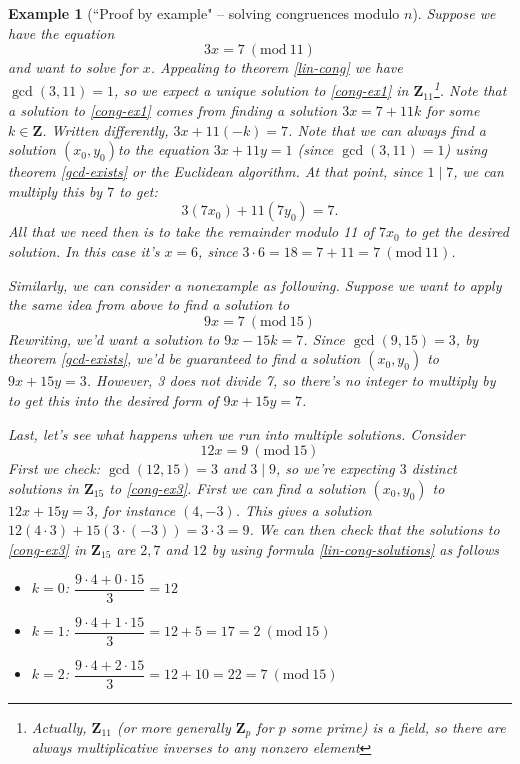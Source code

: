 \documentclass[12pt]{article}
\numberwithin{equation}{subsection}
\theoremstyle{note}
\newtheorem{example}[subsection]{Example}
\newcommand{\Mod}[1]{\ (\mathrm{mod}\ #1)}
\begin{document}
\begin{example}[``Proof by example" -- solving congruences modulo $n$]
Suppose we have the equation \begin{equation} \label{cong-ex1} 3x=7\Mod{11}\end{equation} and want to solve for $x$. Appealing to theorem \ref{lin-cong} we have $\gcd(3,11)=1$, so we expect a unique solution to \eqref{cong-ex1} in $\mathbf{Z}_{11}$\footnote{Actually, $\mathbf{Z}_{11}$ (or more generally $\mathbf{Z}_p$ for $p$ some prime) is a \textit{field}, so there are always multiplicative inverses to any nonzero element}.  Note that a solution to \eqref{cong-ex1} comes from finding a solution $3x=7+11k$ for some $k\in\mathbf{Z}$. Written differently, $3x+11(-k)=7$. Note that we can always find a solution $(x_0,y_0)$to the equation $3x+11y=1$ (since $\gcd(3,11)=1$) using theorem \ref{gcd-exists} or the Euclidean algorithm. At that point, since $1\mid 7$, we can multiply this by $7$ to get: \[ 3(7x_0)+11(7y_0)=7.\] All that we need then is to take the remainder modulo 11 of $7x_0$ to get the desired solution. In this case it's $x=6$, since $3\cdot 6=18=7+11=7\Mod{11}$.

Similarly, we can consider a nonexample as following. Suppose we want to apply the same idea from above to find a solution to \begin{equation} \label{cong-ex2} 9x=7\Mod{15}\end{equation} Rewriting, we'd want a solution to $9x-15k=7$. Since $\gcd(9,15)=3$, by theorem \ref{gcd-exists}, we'd be guaranteed to find a solution $(x_0,y_0)$ to $9x+15y=3$. However, 3 does not divide 7, so there's no integer to multiply by to get this into the desired form of $9x+15y=7$. 

Last, let's see what happens when we run into multiple solutions. Consider \begin{equation} \label{cong-ex3} 12x=9\Mod{15}\end{equation} First we check: $\gcd(12,15)=3$ and $3\mid 9$, so we're expecting $3$ distinct solutions in $\mathbf{Z}_{15}$ to \eqref{cong-ex3}. First we can find a solution $(x_0,y_0)$ to $12x+15y=3$, for instance $(4,-3)$. This gives a solution $12(4\cdot 3)+15(3\cdot (-3))=3\cdot 3=9$. We can then check that the solutions to \eqref{cong-ex3} in $\mathbf{Z}_{15}$ are $2,7$ and $12$ by using formula \eqref{lin-cong-solutions} as follows  \begin{itemize} 
	\item $k=0$: $\dfrac{9\cdot 4+0\cdot 15}{3}=12$
	 \item $k=1$: $\dfrac{9\cdot 4+1\cdot15}{3}=12+5=17=2\Mod{15}$
	 \item $k=2$: $\dfrac{9\cdot 4+2\cdot15}{3}=12+10=22=7\Mod{15}$
	 \end{itemize} 
\end{example}
\end{document}
